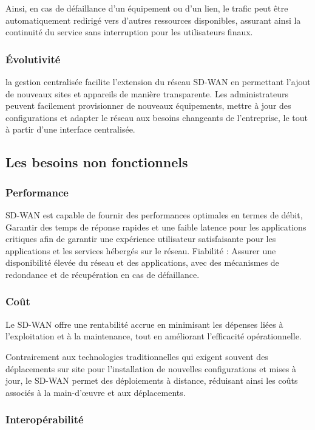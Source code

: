 Ainsi, en cas de défaillance d'un équipement ou d'un lien, le trafic peut être automatiquement redirigé vers d'autres ressources disponibles, assurant ainsi la continuité du service sans interruption pour les utilisateurs finaux.

\subsubsection{Évolutivité }

la gestion centralisée facilite l'extension du réseau SD-WAN en permettant l'ajout de nouveaux sites et appareils de manière transparente. Les administrateurs peuvent facilement provisionner de nouveaux équipements, mettre à jour des configurations et adapter le réseau aux besoins changeants de l'entreprise, le tout à partir d'une interface centralisée.

\subsection{Les besoins non fonctionnels }
\subsubsection{Performance   }

SD-WAN est capable de fournir des performances optimales en termes de débit, Garantir des temps de réponse rapides et une faible latence pour les applications critiques afin de garantir une expérience utilisateur satisfaisante pour les applications et les services hébergés sur le réseau.
Fiabilité : Assurer une disponibilité élevée du réseau et des applications, avec des mécanismes de redondance et de récupération en cas de défaillance.


\subsubsection{Coût  }

Le SD-WAN offre une rentabilité accrue en minimisant les dépenses liées à l'exploitation et à la maintenance, tout en améliorant l'efficacité opérationnelle.

Contrairement aux technologies traditionnelles qui exigent souvent des déplacements sur site pour l'installation de nouvelles configurations et mises à jour, le SD-WAN permet des déploiements à distance, réduisant ainsi les coûts associés à la main-d'œuvre et aux déplacements.

\subsubsection{Interopérabilité  }

